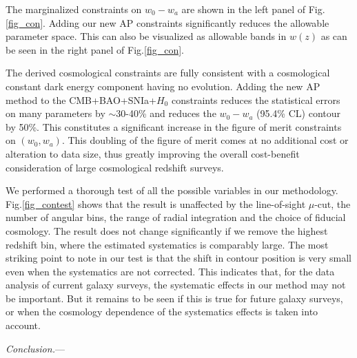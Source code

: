 \documentclass[prl,twocolumn,superscriptaddress,aps,amsmath,amssymb,nofootinbib,altaffilletter]{revtex4}
\begin{document}
The marginalized constraints on $w_0-w_a$ are shown in the left panel of Fig.\ref{fig_con}.
Adding our new AP constraints significantly reduces the allowable parameter space. 
This can also be visualized as allowable bands in $w(z)$ as can be seen in the right panel of Fig.\ref{fig_con}.  

The derived cosmological constraints are fully consistent with a cosmological constant dark energy component having no evolution.
Adding the new AP method to the CMB+BAO+SNIa+$H_0$ constraints reduces the statistical errors on many parameters by $\sim$30-40\% 
and reduces the $w_0-w_a$ (95.4\% CL) contour by 50\%.
This constitutes a significant increase in the figure of merit constraints on $(w_0, w_a)$. 
This doubling of the figure of merit comes at no additional cost or alteration to data size, 
thus greatly improving the overall cost-benefit consideration of large cosmological redshift surveys.

We performed a thorough test of all the possible variables in our methodology.
Fig.\ref{fig_contest} shows that 
the result is unaffected by the line-of-sight $\mu$-cut, 
the number of angular bins, 
the range of radial integration and the choice of fiducial cosmology. 
The result does not change significantly if we remove the highest redshift bin,
where the estimated systematics is comparably large.
The most striking point to note in our test is that the 
shift in contour position is very small even when %
the systematics are not corrected.
This indicates that, for the data analysis of current galaxy surveys,
the systematic effects in our method may not be important.
But it remains to be seen if this is true for future galaxy surveys,
or when the cosmology dependence of the systematics effects is taken into account.


{\it Conclusion.}---
\end{document}
